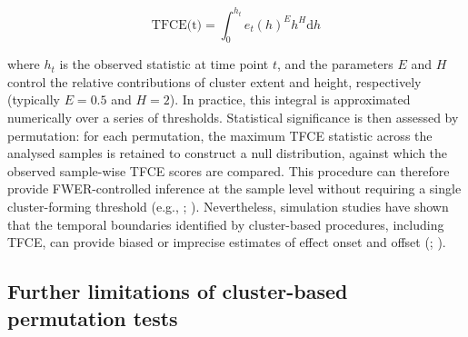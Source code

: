 \documentclass[
  doc,
  floatsintext,
  longtable,
  a4paper,
  nolmodern,
  notxfonts,
  notimes,
  colorlinks=true,linkcolor=blue,citecolor=blue,urlcolor=blue]{apa7}
\begin{document}
\[
\text{TFCE(t)} = \int_{0}^{h_{t}} e_{t}(h)^{E} h^{H} \mathrm{d}h
\]

where \(h_{t}\) is the observed statistic at time point \(t\), and the
parameters \(E\) and \(H\) control the relative contributions of cluster
extent and height, respectively (typically \(E=0.5\) and \(H=2\)). In
practice, this integral is approximated numerically over a series of
thresholds. Statistical significance is then assessed by permutation:
for each permutation, the maximum TFCE statistic across the analysed
samples is retained to construct a null distribution, against which the
observed sample-wise TFCE scores are compared. This procedure can
therefore provide FWER-controlled inference at the sample level without
requiring a single cluster-forming threshold (e.g.,
;
). Nevertheless,
simulation studies have shown that the temporal boundaries identified by
cluster-based procedures, including TFCE, can provide biased or
imprecise estimates of effect onset and offset
(;
).

\subsection{Further limitations of cluster-based permutation
tests}\label{further-limitations-of-cluster-based-permutation-tests}
\end{document}
